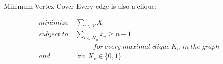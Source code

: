 \documentclass{beamer}
\begin{document}
\begin{frame}{Minimum Vertex Cover}
Every edge is also a clique:

\pause
\begin{align*}
&minimize \; \;\; \; \sum_{v\in V}X_v\\
&subject\; to \;\;\; \; \sum_{v\in K_n}x_v \geq n - 1\\
& \qquad\qquad \qquad\qquad for\; every\; maximal\; clique\; K_n\; in\; the\; graph\\
&and	\qquad\qquad	 \forall v, X_v\in \{0,1\}
\end{align*}



\end{frame}
\begin{comment}

\begin{frame}{Maximal Clique}


\begin{algorithm}[H]
\begin{algorithmic}[1]

\STATE BronKerbosch({$R, P, X$})\\

        \IF{$P$ and $X$ are both empty}{
        
		  	 report $R$ as a maximal clique\\	
		 }\ENDIF
		\FOR{vertex $v$ in $P$}{
		
			   BronKerbosch$(R \cup \{v\}, P \cap N(v), X \cap N(v))$
			   
			    $P := P\setminus \{v\}$
			    
			   	   $X := X\cup \{v\}$\\
		}\ENDFOR

\end{algorithmic}
\caption{Bron-Kerbosch}
\end{algorithm}

\end{frame}
\end{comment}
\end{document}
